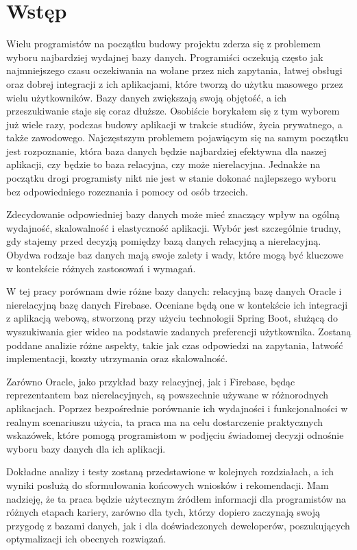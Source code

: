 \chapter*{Wstęp}


Wielu programistów na początku budowy projektu zderza się z problemem wyboru najbardziej wydajnej bazy danych. Programiści oczekują często jak najmniejszego czasu oczekiwania na wołane przez nich zapytania, łatwej obsługi oraz dobrej integracji z ich aplikacjami, które tworzą do użytku masowego przez wielu użytkowników. Bazy danych zwiększają swoją objętość, a  ich przeszukiwanie staje się coraz dłuższe. Osobiście borykałem się z tym wyborem już wiele razy, podczas budowy aplikacji w trakcie studiów, życia prywatnego, a także zawodowego. Najczęstszym problemem pojawiącym się na samym początku jest rozpoznanie, która baza danych będzie najbardziej efektywna dla naszej aplikacji, czy będzie to baza relacyjna, czy może nierelacyjna. Jednakże na początku drogi programisty nikt nie jest w stanie dokonać najlepszego wyboru bez odpowiedniego rozeznania i pomocy od osób trzecich.

Zdecydowanie odpowiedniej bazy danych może mieć znaczący wpływ na ogólną wydajność, skalowalność i elastyczność aplikacji. Wybór jest szczególnie trudny, gdy stajemy przed decyzją pomiędzy bazą danych relacyjną a nierelacyjną. Obydwa rodzaje baz danych mają swoje zalety i wady, które mogą być kluczowe w kontekście różnych zastosowań i wymagań.

W tej pracy porównam dwie różne bazy danych: relacyjną bazę danych Oracle i nierelacyjną bazę danych Firebase. Oceniane będą one w kontekście ich integracji z aplikacją webową, stworzoną przy użyciu technologii Spring Boot, służącą do wyszukiwania gier wideo na podstawie zadanych preferencji użytkownika. Zostaną poddane analizie różne aspekty, takie jak czas odpowiedzi na zapytania, łatwość implementacji, koszty utrzymania oraz skalowalność.

Zarówno Oracle, jako przykład bazy relacyjnej, jak i Firebase, będąc reprezentantem baz nierelacyjnych, są powszechnie używane w różnorodnych aplikacjach. Poprzez bezpośrednie porównanie ich wydajności i funkcjonalności w realnym scenariuszu użycia, ta praca ma na celu dostarczenie praktycznych wskazówek, które pomogą programistom w podjęciu świadomej decyzji odnośnie wyboru bazy danych dla ich aplikacji.

Dokładne analizy i testy zostaną przedstawione w kolejnych rozdziałach, a ich wyniki posłużą do sformułowania końcowych wniosków i rekomendacji. Mam nadzieję, że ta praca będzie użytecznym źródłem informacji dla programistów na różnych etapach kariery, zarówno dla tych, którzy dopiero zaczynają swoją przygodę z bazami danych, jak i dla doświadczonych deweloperów, poszukujących optymalizacji ich obecnych rozwiązań.
